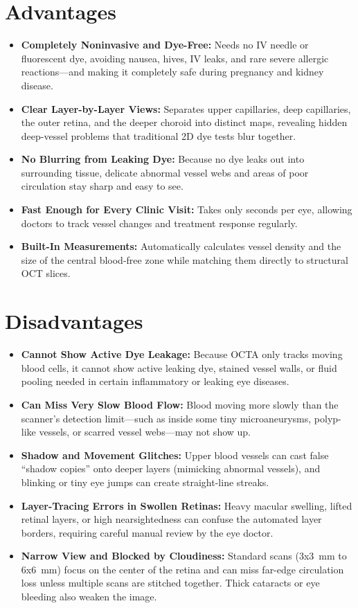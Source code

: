 \section{Advantages}
\begin{itemize}
\item \textbf{Completely Noninvasive and Dye-Free:} Needs no IV needle or fluorescent dye, avoiding nausea, hives, IV leaks, and rare severe allergic reactions---and making it completely safe during pregnancy and kidney disease.
\item \textbf{Clear Layer-by-Layer Views:} Separates upper capillaries, deep capillaries, the outer retina, and the deeper choroid into distinct maps, revealing hidden deep-vessel problems that traditional 2D dye tests blur together.
\item \textbf{No Blurring from Leaking Dye:} Because no dye leaks out into surrounding tissue, delicate abnormal vessel webs and areas of poor circulation stay sharp and easy to see.
\item \textbf{Fast Enough for Every Clinic Visit:} Takes only seconds per eye, allowing doctors to track vessel changes and treatment response regularly.
\item \textbf{Built-In Measurements:} Automatically calculates vessel density and the size of the central blood-free zone while matching them directly to structural OCT slices.
\end{itemize}

\section{Disadvantages}
\begin{itemize}
\item \textbf{Cannot Show Active Dye Leakage:} Because OCTA only tracks moving blood cells, it cannot show active leaking dye, stained vessel walls, or fluid pooling needed in certain inflammatory or leaking eye diseases.
\item \textbf{Can Miss Very Slow Blood Flow:} Blood moving more slowly than the scanner's detection limit---such as inside some tiny microaneurysms, polyp-like vessels, or scarred vessel webs---may not show up.
\item \textbf{Shadow and Movement Glitches:} Upper blood vessels can cast false ``shadow copies'' onto deeper layers (mimicking abnormal vessels), and blinking or tiny eye jumps can create straight-line streaks.
\item \textbf{Layer-Tracing Errors in Swollen Retinas:} Heavy macular swelling, lifted retinal layers, or high nearsightedness can confuse the automated layer borders, requiring careful manual review by the eye doctor.
\item \textbf{Narrow View and Blocked by Cloudiness:} Standard scans (3x3~mm to 6x6~mm) focus on the center of the retina and can miss far-edge circulation loss unless multiple scans are stitched together. Thick cataracts or eye bleeding also weaken the image.
\end{itemize}

